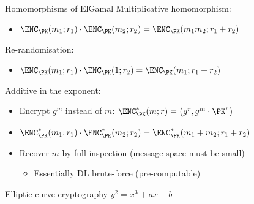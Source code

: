 \begin{frame}{Homomorphisms of ElGamal}
  \pause
  Multiplicative homomorphism:
  \begin{itemize}
    \item $\ENC_\PK(m_1; r_1) \cdot \ENC_\PK(m_2; r_2) = \ENC_\PK(m_1m_2; r_1 + r_2)$
  \end{itemize}

  \pause
  Re-randomisation:
  \begin{itemize}
    \item $\ENC_\PK(m_1; r_1) \cdot \ENC_\PK(1; r_2) = \ENC_\PK(m_1; r_1 + r_2)$
  \end{itemize}

  \pause
  Additive in the exponent:
  \begin{itemize}[<+(1)->]
    \item Encrypt $g^m$ instead of $m$: $\ENC^*_\PK(m; r) = \bigl(g^r, g^m \cdot \PK^r\bigr)$
    \item $\ENC^*_\PK(m_1; r_1) \cdot \ENC^*_\PK(m_2; r_2) = \ENC^*_\PK(m_1 + m_2; r_1 + r_2)$
    \item Recover $m$ by full inspection (message space must be small)
    \begin{itemize}
      \item Essentially DL brute-force (pre-computable)
    \end{itemize}
  \end{itemize}
\end{frame}

\begin{frame}{Elliptic curve cryptography}
  $y^2 = x^3 + ax + b$
  \vspace*{-2em}
  \begin{center}
  \end{center}
\end{frame}

